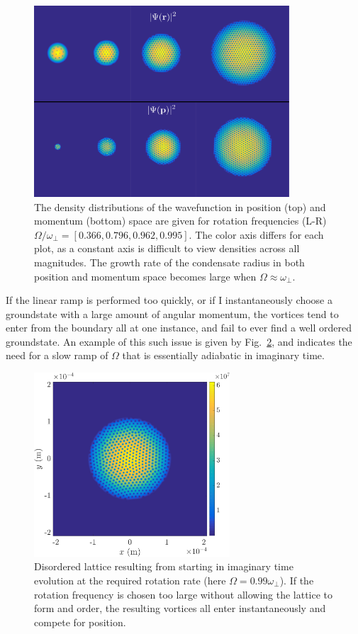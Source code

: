 \begin{figure}\centering
    \includegraphics[width=0.85\textwidth]{Images/ch4_vtx/ramp_omega.pdf}
    \caption{The density distributions of the wavefunction in position (top) and momentum (bottom) space are given for rotation frequencies (L-R) $\Omega/\omega_\perp=[0.366,0.796,0.962,0.995]$. The color axis differs for each plot, as a constant axis is difficult to view densities across all magnitudes. The growth rate of the condensate radius in both position and momentum space becomes large when $\Omega \approx \omega_\perp$.}
    \label{fig:inc_omega}
\end{figure}

If the linear ramp is performed too quickly, or if I instantaneously choose a groundstate with a large amount of angular momentum, the vortices tend to enter from the boundary all at one instance, and fail to ever find a well ordered groundstate. An example of this such issue is given by Fig.~\ref{fig:malformed_lattice}, and indicates the need for a slow ramp of $\Omega$ that is essentially adiabatic in imaginary time.

\begin{figure}
    \centering
    \includegraphics[width=0.65\textwidth]{Images/ch4_vtx/toofast_099_1e7}
    \caption{Disordered lattice resulting from starting in imaginary time evolution at the required rotation rate (here $\Omega=0.99\omega_\perp$). If the rotation frequency is chosen too large without allowing the lattice to form and order, the resulting vortices all enter instantaneously and compete for position. }
    \label{fig:malformed_lattice}
\end{figure}

